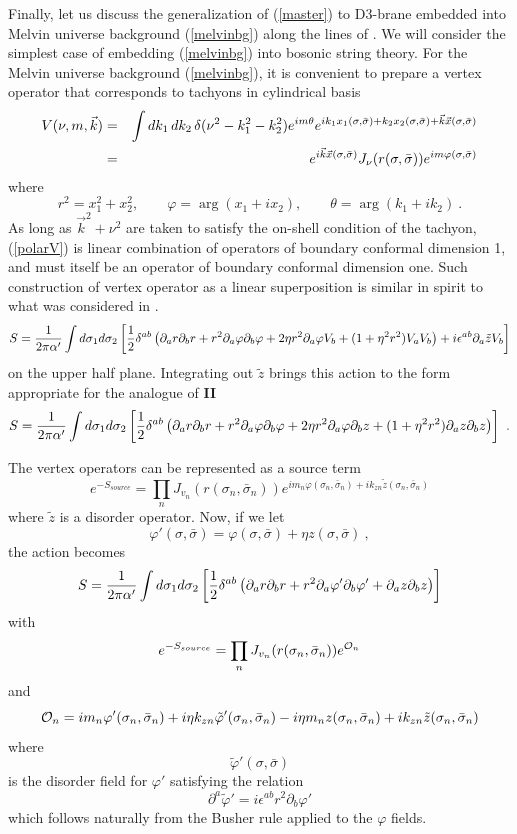 \documentclass[12pt]{article}
\newcommand{\be}{\begin{equation}}
\newcommand{\ee}{\end{equation}}
\newcommand{\beq}{\begin{eqnarray}}
\newcommand{\eeq}{\end{eqnarray}}
\begin{document}
Finally, let us discuss the generalization of (\ref{master}) to
D3-brane embedded into Melvin universe background (\ref{melvinbg})
along the lines of \cite{Hashimoto:2004pb,Hashimoto:2005hy}. We will
consider the simplest case of embedding (\ref{melvinbg}) into bosonic
string theory. For the Melvin universe background (\ref{melvinbg}), it
is convenient to prepare a vertex operator that corresponds to
tachyons in cylindrical basis
%
\beq V(\nu,m,\vec k) &=&
\int d k_1 \,  d k_2\,  \delta(\nu^2 - k_1^2 - k_2^2) e^{i m \theta} e^{i  k_1 x_1(\sigma,\bar \sigma) + k_2 x_2(\sigma,\bar \sigma) + \vec k \vec x(\sigma,\bar \sigma)} \cr
& = & e^{i \vec k \vec x(\sigma,\bar \sigma)} J_\nu(r(\sigma,\bar \sigma)) e^{i m \varphi(\sigma,\bar \sigma)}  \label{polarV} \eeq
%
where 
%
\be r^2 = x_1^2+x_2^2, \qquad \varphi = \arg(x_1 + i x_2), \qquad \theta = \arg(k_1 + i k_2) \ . \ee
%
As long as $\vec k^2 + \nu^2$ are taken to satisfy the on-shell
condition of the tachyon, (\ref{polarV}) is linear combination of
operators of boundary conformal dimension 1, and must itself be an
operator of boundary conformal dimension one. Such construction of
vertex operator as a linear superposition is similar in spirit to what
was considered in \cite{Liu:2002ft,Liu:2002kb}.
%
\be S= {1 \over 2 \pi \alpha'} \int d \sigma_1 d \sigma_2 \left[{1 \over 2} \delta^{ab} \left( \partial_a r \partial_b r + r^2 \partial_a \varphi \partial_b \varphi + 2 \eta r^2 \partial_a \varphi  V_b + (1 + \eta^2 r^2) V_a V_b\right) + i \epsilon^{ab} \partial_a \tilde z  V_b \right]\label{melsig1}\ee
%
on the upper half plane. Integrating out $\tilde z$ brings this action to the form appropriate for the analogue of {\bf II}
%
\be S= {1 \over 2 \pi \alpha'} \int d \sigma_1 d \sigma_2 \left[{1 \over 2} \delta^{ab} \left( \partial_a r \partial_b r + r^2 \partial_a \varphi \partial_b \varphi + 2 \eta r^2 \partial_a \varphi  \partial_b z  + (1 + \eta^2 r^2) \partial_a z \partial_b z\right)  \right]\label{melsig1a}\ . \ee
%


The vertex operators can be represented as a source term
%
\be e^{-S_{source}} = \prod_n J_{v_n}(r(\sigma_n,\bar \sigma_n)) e^{i m_n \varphi(\sigma_n,\bar \sigma_n) + i k_{zn} \tilde z (\sigma_n, \bar \sigma_n)}  \ee
%
where $\tilde z$ is a disorder operator. Now, if we let
%
\be \varphi'(\sigma,\bar \sigma)   = \varphi(\sigma,\bar \sigma) + \eta z(\sigma,\bar \sigma) \ , \ee
%
the action becomes
%
\be S= {1 \over 2 \pi \alpha'} \int d \sigma_1 d \sigma_2 \left[{1 \over 2} \delta^{ab} \left( \partial_a r \partial_b r + r^2 \partial_a \varphi' \partial_b \varphi' +  \partial_a z \partial_b z \right) \right]\label{melsig2}\ee
%
with 
%
\be e^{-S_{source}} = \prod_n J_{v_n}(r(\sigma_n,\bar \sigma_n)) e^{{\cal O}_n}  \ee
%
and
%
\be {\cal O}_n = 
i m_n \varphi'(\sigma_n, \bar \sigma_n)+ i \eta k_{zn} \tilde \varphi'(\sigma_n,\bar \sigma_n) -i \eta m_n z(\sigma_n,\bar \sigma_n) + i k_{zn} \tilde z (\sigma_n, \bar \sigma_n) \label{melvinO} \ee
%
where
%
\be \tilde \varphi'(\sigma,\bar \sigma) \ee
%
is the disorder field for $\varphi'$ satisfying the relation
%
\be \partial^a \tilde \varphi' = i \epsilon^{ab} r^2 \partial_b \varphi' \ee
%
which follows naturally from the Busher rule applied to the $\varphi$ fields.
\end{document}
